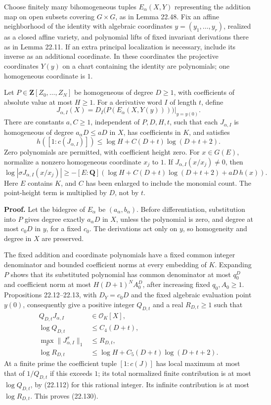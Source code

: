 \documentclass[
  11pt,
  a4paper,
]{article}
\begin{document}
Choose finitely many bihomogeneous tuples \(E_\alpha(X,Y)\) representing
the addition map on open subsets covering \(G\times G\), as in Lemma
22.48. Fix an affine neighborhood of the identity with algebraic
coordinates \(y=(y_1,\ldots,y_r)\), realized as a closed affine variety,
and polynomial lifts of fixed invariant derivations there as in Lemma
22.11. If an extra principal localization is necessary, include its
inverse as an additional coordinate. In these coordinates the projective
coordinates \(Y(y)\) on a chart containing the identity are polynomials;
one homogeneous coordinate is \(1\).

Let \(P\in\mathbf Z[Z_0,\ldots,Z_N]\) be homogeneous of degree
\(D\ge1\), with coefficients of absolute value at most \(H\ge1\). For a
derivative word \(I\) of length \(t\), define \[
 J_{\alpha,I}(X)=
 \left.D_I\bigl(P(E_\alpha(X,Y(y)))\bigr)\right|_{y=y(0)}.
 \tag{22.129}
\] There are constants \(a,C\ge1\), independent of \(P,D,H,t\), such
that each \(J_{\alpha,I}\) is homogeneous of degree \(a_\alpha D\le aD\)
in \(X\), has coefficients in \(K\), and satisfies \[
 h([1:c(J_{\alpha,I})])
 \le \log H+C(D+t)\log(D+t+2).
 \tag{22.130}
\] Zero polynomials are permitted, with coefficient height zero. For
\(x\in G(E)\), normalize a nonzero homogeneous coordinate \(x_j\) to
\(1\). If \(J_{\alpha,I}(x/x_j)\ne0\), then \[
 \log\left|\sigma J_{\alpha,I}(x/x_j)\right|
 \ge-[E:\mathbf Q]\!
 \left(\log H+C(D+t)\log(D+t+2)+aD\,h(x)\right).
 \tag{22.131}
\] Here \(E\) contains \(K\), and \(C\) has been enlarged to include the
monomial count. The point-height term is multiplied by \(D\), not by
\(t\).

\textbf{Proof.} Let the bidegree of \(E_\alpha\) be
\((a_\alpha,b_\alpha)\). Before differentiation, substitution into \(P\)
gives degree exactly \(a_\alpha D\) in \(X\), unless the polynomial is
zero, and degree at most \(c_0D\) in \(y\), for a fixed \(c_0\). The
derivations act only on \(y\), so homogeneity and degree in \(X\) are
preserved.

The fixed addition and coordinate polynomials have a fixed common
integer denominator and bounded coefficient norms at every embedding of
\(K\). Expanding \(P\) shows that its substituted polynomial has common
denominator at most \(q_0^D\) and coefficient norm at most
\(H(D+1)^N A_0^D\), after increasing fixed \(q_0,A_0\ge1\). Propositions
22.12--22.13, with \(D_Y=c_0D\) and the fixed algebraic evaluation point
\(y(0)\), consequently give a positive integer \(Q_{D,t}\) and a real
\(R_{D,t}\ge1\) such that \[
\begin{split}
 Q_{D,t}J_{\alpha,I}&\in\mathcal O_K[X],\\
 \log Q_{D,t}&\le C_4(D+t),\\
 \max_\sigma\|J_{\alpha,I}^\sigma\|_1&\le R_{D,t},\\
 \log R_{D,t}&\le\log H+C_5(D+t)\log(D+t+2).
\end{split}
\tag{22.132}
\] At a finite prime the coefficient tuple \([1:c(J)]\) has local
maximum at most that of \(1/Q_{D,t}\) if this exceeds \(1\); its total
normalized finite contribution is at most \(\log Q_{D,t}\), by (22.112)
for this rational integer. Its infinite contribution is at most
\(\log R_{D,t}\). This proves (22.130).
\end{document}
